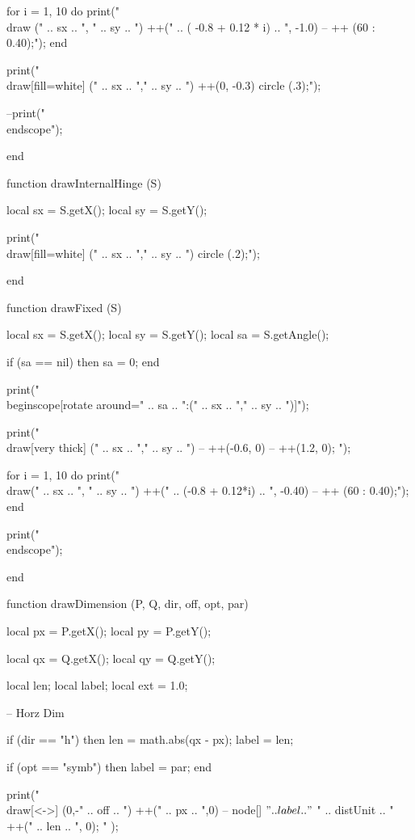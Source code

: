 \begin{luacode}
		for i = 1, 10 do
			print("\\draw (" .. sx ..  ", " ..  sy .. ") ++(" .. ( -0.8 + 0.12 * i) .. ", -1.0) -- ++ (60 : 0.40);");
		end
	
		print("\\draw[fill=white] (" .. sx .. "," .. sy .. ") ++(0, -0.3) circle (.3);");
	
	--print("\\end{scope}");
	
end

function drawInternalHinge (S)

	local sx = S.getX();
	local sy = S.getY();
	
	print("\\draw[fill=white] (" .. sx .. "," .. sy .. ") circle (.2);");
	
	
end


function drawFixed (S)
	
	local sx = S.getX();
	local sy = S.getY();
	local sa = S.getAngle();
	
	if (sa == nil) then sa = 0; end
	
	print("\\begin{scope}[rotate around={" .. sa .. ":(" .. sx .. "," .. sy  .. ")}]");

		print("\\draw[very thick] (" .. sx .. "," .. sy .. ") -- ++(-0.6, 0) -- ++(1.2, 0); ");

		for i = 1, 10 do
			print("\\draw(" .. sx ..  ", " ..  sy .. ") ++(" .. (-0.8 + 0.12*i) .. ", -0.40) -- ++ (60 : 0.40);");
		end
		
	print("\\end{scope}");
	
end

function drawDimension (P, Q, dir, off, opt, par)
	
	local px = P.getX();
	local py = P.getY();
	
	local qx = Q.getX();
	local qy = Q.getY();
	
	local len;
	local label;
	local ext = 1.0;
	
	-- Horz Dim
	
	if (dir == "h") then
		len = math.abs(qx - px);
		label = len;
		
		if (opt == "symb") then
			label = par;
		end
		
		print("\\draw[<->] (0,-" .. off .. ") ++(" .. px .. ",0) -- node[] {$" .. label  .. "$ " .. distUnit .. "} ++(" .. len .. ", 0); " );
		

\end{luacode}
